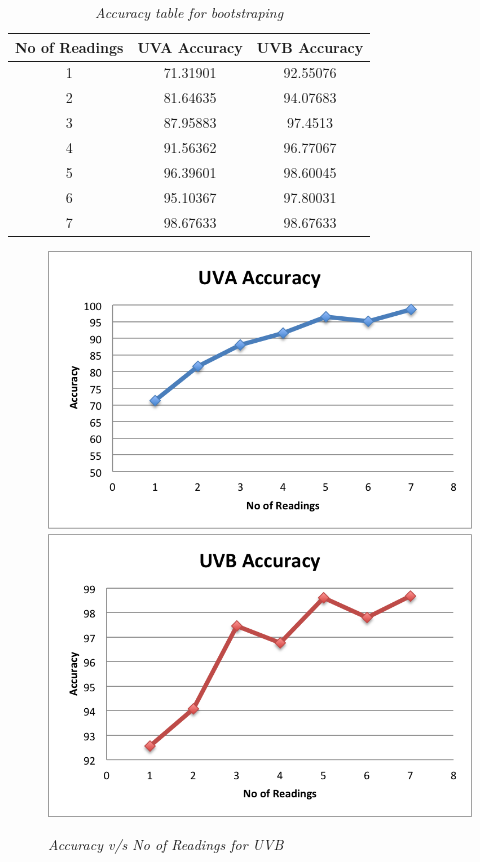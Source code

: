 \documentclass[12pt,fullpage,doublespace]{article}
\begin{document}
\newpage
\begin{table}
\centering
\begin{tabular}{|c|c|c|}
\hline
No of Readings & UVA Accuracy & UVB Accuracy \\
\hline 
1 & 71.31901 & 92.55076\\
\hline
2 & 81.64635 & 94.07683\\
\hline
3 & 87.95883 & 97.4513\\
\hline
4 & 91.56362 & 96.77067\\
\hline
5 & 96.39601 & 98.60045\\
\hline
6 & 95.10367 & 97.80031\\
\hline
7 & 98.67633 & 98.67633\\
\hline
\end{tabular}
\caption{\small \sl Accuracy table for bootstraping}\label{seg6accuracy}
\end{table}


\begin{figure}
\begin{center}
\includegraphics[scale=0.5]{segment6uva.png}
\includegraphics[scale=0.5]{segment6uvb.png}
\caption{\small \sl Accuracy v/s No of Readings for UVB}
\label{fig:lessReadings}
\end{center}
\end{figure}
\end{document}
